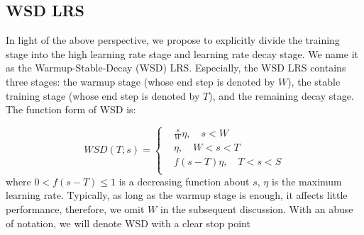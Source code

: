 \subsection{WSD LRS}
In light of the above perspective, we propose to explicitly divide the training stage into the high learning rate stage and learning rate decay stage. We name it as the Warmup-Stable-Decay (WSD) LRS.  Especially, the WSD LRS contains three stages: the warmup stage (whose end step is denoted by $W$), the stable training stage (whose end step is denoted by $T$), and the remaining decay stage. The function form of WSD is:

\vspace{-2mm}
\begin{equation}
    WSD(T; s) = \begin{cases}
       & \frac{s}{W} \eta, \quad s<W\\
       & \eta, \quad W < s < T \\
       & f(s-T)\eta,\quad T < s < S\\
    \end{cases}
\end{equation}
where $0< f(s-T)\leq 1$ is a decreasing function about $s$, $\eta$ is the maximum learning rate. Typically, as long as the warmup stage is enough, it affects little performance, therefore, we omit $W$ in the subsequent discussion. With an abuse of notation, we will denote  WSD with a clear stop point 

